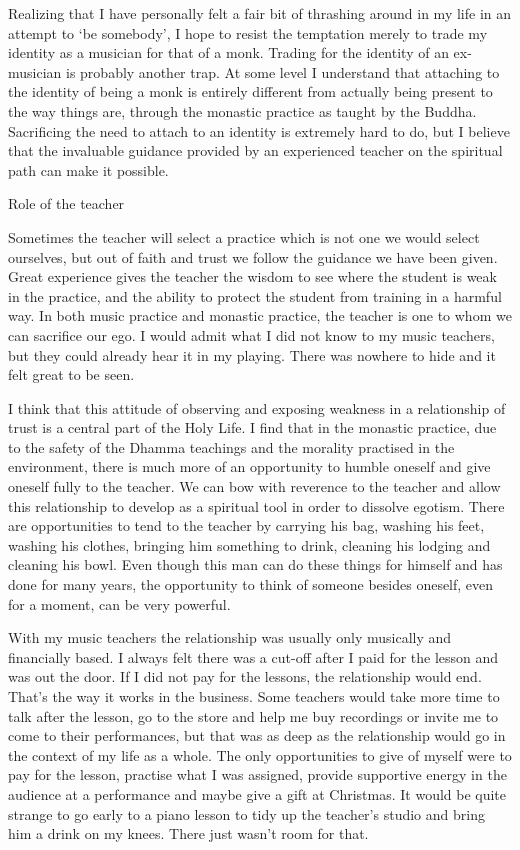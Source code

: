 Realizing that I have personally felt a fair bit of thrashing around in
my life in an attempt to `be somebody', I hope to resist the temptation
merely to trade my identity as a musician for that of a monk. Trading
for the identity of an ex-musician is probably another trap. At some
level I understand that attaching to the identity of being a monk is
entirely different from actually being present to the way things are,
through the monastic practice as taught by the Buddha. Sacrificing the
need to attach to an identity is extremely hard to do, but I believe
that the invaluable guidance provided by an experienced teacher on the
spiritual path can make it possible.

Role of the teacher

Sometimes the teacher will select a practice which is not one we would
select ourselves, but out of faith and trust we follow the guidance we
have been given. Great experience gives the teacher the wisdom to see
where the student is weak in the practice, and the ability to protect
the student from training in a harmful way. In both music practice and
monastic practice, the teacher is one to whom we can sacrifice our ego.
I would admit what I did not know to my music teachers, but they could
already hear it in my playing. There was nowhere to hide and it felt
great to be seen.

I think that this attitude of observing and exposing weakness in a
relationship of trust is a central part of the Holy Life. I find that in
the monastic practice, due to the safety of the Dhamma teachings and the
morality practised in the environment, there is much more of an
opportunity to humble oneself and give oneself fully to the teacher. We
can bow with reverence to the teacher and allow this relationship to
develop as a spiritual tool in order to dissolve egotism. There are
opportunities to tend to the teacher by carrying his bag, washing his
feet, washing his clothes, bringing him something to drink, cleaning his
lodging and cleaning his bowl. Even though this man can do these things
for himself and has done for many years, the opportunity to think of
someone besides oneself, even for a moment, can be very powerful.

With my music teachers the relationship was usually only musically and
financially based. I always felt there was a cut-off after I paid for
the lesson and was out the door. If I did not pay for the lessons, the
relationship would end. That's the way it works in the business. Some
teachers would take more time to talk after the lesson, go to the store
and help me buy recordings or invite me to come to their performances,
but that was as deep as the relationship would go in the context of my
life as a whole. The only opportunities to give of myself were to pay
for the lesson, practise what I was assigned, provide supportive energy
in the audience at a performance and maybe give a gift at Christmas. It
would be quite strange to go early to a piano lesson to tidy up the
teacher's studio and bring him a drink on my knees. There just wasn't
room for that.

